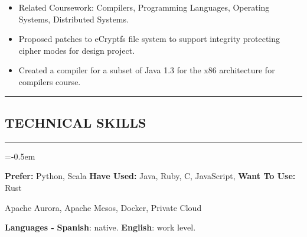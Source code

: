 \documentclass[10pt,letterpaper]{article}
\newcommand{\CPP}
{C\nolinebreak[4]\hspace{-.05em}\raisebox{.22ex}{\footnotesize\bf ++}}
\newcommand{\sectionTitle}[1]{
  \hrule
  \vspace{-1.0em} 
  \subsection*{\uppercase{\textbf{#1}}}
  \vspace{-0.3em}
    \hrule
    \vspace{0.5em}  
}
\newcommand{\languageSection}[4]{
  \vspace{-1.0em}
  \begin{center}
    \textbf{Languages - } \textbf{#1}: #2. \textbf{#3}: #4.
  \end{center}
}
\begin{document}
  \begin{itemize}[label=\textbullet]
    \item Related Coursework: Compilers, Programming Languages, Operating
    Systems, Distributed Systems.
    \item Proposed patches to eCryptfs file system to support
    integrity protecting cipher modes for design project.
    \item Created a compiler for a subset of Java 1.3 for the
    x86 architecture for compilers course.
  \end{itemize}
  
  \sectionTitle{Technical Skills}
  \begin{description}[labelindent=\parindent]
    \parskip=-0.5em
    \item[Languages:] \textbf{Prefer:} Python, Scala \textbf{Have Used:} Java, Ruby, \CPP, JavaScript, \textbf{Want To Use:} Rust
    \item[Systems:] Apache Aurora, Apache Mesos, Docker, Private Cloud
  \end{description}
  
  \languageSection{Spanish}{native}{English}{work level}
  
\end{document}
